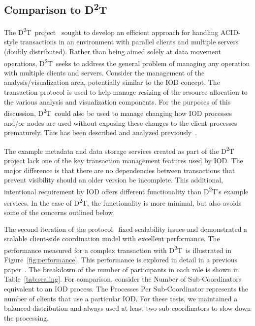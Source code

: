 \documentclass[conference]{sig-alt-gov2}
\newcommand{\DDT}{D\textsuperscript{2}T~}
\newcommand{\DDTns}{D\textsuperscript{2}T}
\begin{document}
\subsection{Comparison to \DDTns}
The \DDT project~\cite{lofstead:2012:txn} sought to develop an efficient
approach for handling ACID-style transactions in an environment with parallel
clients and multiple servers (doubly distributed). Rather than being aimed
solely at data movement operations, \DDT seeks to address the general problem
of managing any operation with multiple clients and servers.  Consider the
management of the analysis/visualization area, potentially similar to the IOD
concept. The transaction protocol is used to help manage resizing of the
resource allocation to the various analysis and visualization components.  For
the purposes of this discussion, \DDT could also be used to manage changing how
IOD processes and/or nodes are used without exposing these changes to the
client processes prematurely.  This has been described and analyzed
previously~\cite{dayal:2013:io-containers}.

The example metadata and data storage services created as part of the \DDT
project lack one of the key transaction management features used by IOD.
The major difference is that there are no dependencies between transactions
that prevent visibility should an older version be incomplete. This additional,
intentional requirement by IOD offers different functionality than \DDTns's
example services. In the case of \DDTns, the functionality is more minimal, but
also avoids some of the concerns outlined below.

The second iteration of the protocol~\cite{lofstead:2013:pdsw-txn} fixed
scalability issues and demonstrated a scalable client-side coordination model
with excellent performance. The performance measured for a complex transaction
with \DDT is illustrated in Figure~\ref{fig:performance}. This performance is
explored in detail in a previous paper~\cite{lofstead:2013:pdsw-txn}. The
breakdown of the number of participants in each role is shown in
Table~\ref{tab:scaling}. For comparison, consider the Number of
Sub-Coordinators equivalent to an IOD process. The Processes Per
Sub-Coordinator represents the number of clients that use a particular IOD. For
these tests, we maintained a balanced distribution and always used at least two
sub-coordinators to slow down the processing.
\end{document}
